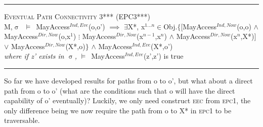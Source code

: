 \documentclass[a4paper,11pt, twoside,twocolumn]{article}
\newenvironment{logic}[1][]
{\begin{flushleft} \small }
{\end{flushleft}}
\newcommand{\loin}{$\in$}
\newcommand{\loexists}{$\exists$}
\newcommand{\loand}{$\land$}
\newcommand{\loor} {$\lor$}
\newcommand{\loimplies}{$\implies$}
\newcommand{\losigma}{$\upsigma$}
\newcommand{\loturns} {$\vDash$}
\newcommand{\ablock} {\null\qquad}
\begin{document}
\begin{logic}
\hrule\null
\textsc{\normalsize *Eventual Path Connectivity 3*** (EPC3***)}\\
M,\losigma\ \loturns\ MayAccess$^{Ind,Eve}$(o,o')\linebreak
\ablock \loimplies\linebreak
\ablock \loexists X*, x$^{1...n}$\loin Obj.$\{[$MayAccess$^{Ind,Now}$(o,o)\linebreak
\ablock \ablock \ablock \ablock \ablock \loand\linebreak
\ablock \ablock \ablock \ablock \ablock MayAccess$^{Dir,Now}$(o,x$^1$)\linebreak
\ablock \ablock \ablock \ablock \ablock $\vdots$\linebreak
\ablock \ablock \ablock \ablock \ablock MayAccess$^{Dir,Now}$(x$^{n-1}$,x$^n$)\linebreak
\ablock \ablock \ablock \ablock \ablock \loand\linebreak
\ablock \ablock \ablock \ablock \ablock MayAccess$^{Dir,Now}$(x$^n$,X*)$]$\linebreak
\ablock \ablock \ablock \ablock \quad\: \loor \linebreak
\ablock \ablock \ablock \ablock \quad\: MayAccess$^{Dir,Now}$(X*,o)$\}$\linebreak
\ablock \ablock \ablock \ablock \loand \linebreak
\ablock \ablock \ablock \quad MayAccess$^{Ind,Eve}$(X*,o')
\\
\ablock \textit{where if z' exists in \losigma,} \linebreak
\ablock \loturns\ MayAccess$^{Ind,Eve}$(z',z') is true \linebreak
\\
\hrule
\end{logic}



So far we have developed results for paths from o to o', but what about a direct path from o to o' (what are the conditions such that o will have the direct capability of o' eventually)? Luckily, we only need construct \textsc{eec} from \textsc{epc1}, the only difference being we now require the path from o to X* in \textsc{epc1} to be traversable.
\end{document}
